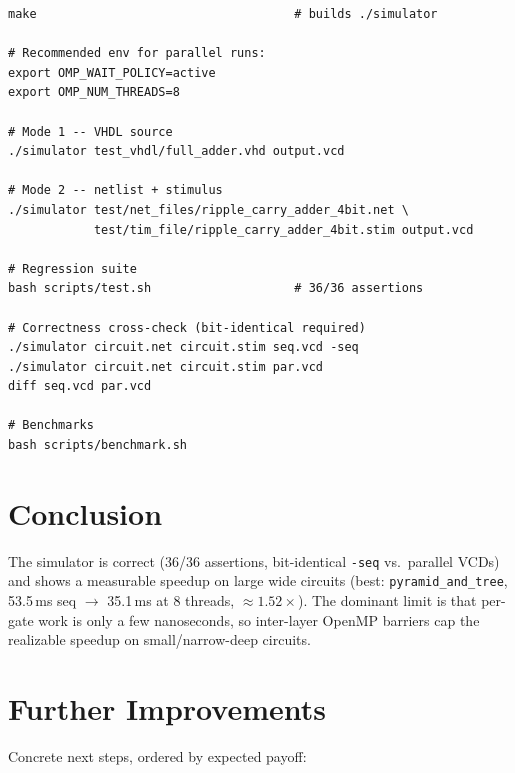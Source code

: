 \documentclass[9pt,a4paper]{article}
\begin{document}
\begin{lstlisting}
make                                    # builds ./simulator

# Recommended env for parallel runs:
export OMP_WAIT_POLICY=active
export OMP_NUM_THREADS=8

# Mode 1 -- VHDL source
./simulator test_vhdl/full_adder.vhd output.vcd

# Mode 2 -- netlist + stimulus
./simulator test/net_files/ripple_carry_adder_4bit.net \
            test/tim_file/ripple_carry_adder_4bit.stim output.vcd

# Regression suite
bash scripts/test.sh                    # 36/36 assertions

# Correctness cross-check (bit-identical required)
./simulator circuit.net circuit.stim seq.vcd -seq
./simulator circuit.net circuit.stim par.vcd
diff seq.vcd par.vcd

# Benchmarks
bash scripts/benchmark.sh
\end{lstlisting}

\section{Conclusion}

The simulator is correct (36/36 assertions, bit-identical \texttt{-seq} vs.\ parallel VCDs) and shows a measurable speedup on large wide circuits (best: \texttt{pyramid\_and\_tree}, 53.5\,ms seq $\to$ 35.1\,ms at 8 threads, $\approx 1.52\times$). The dominant limit is that per-gate work is only a few nanoseconds, so inter-layer OpenMP barriers cap the realizable speedup on small/narrow-deep circuits.

\section{Further Improvements}

Concrete next steps, ordered by expected payoff:
\end{document}
